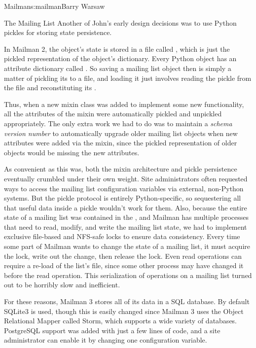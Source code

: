 \begin{aosachapter}{Mailman}{s:mailman}{Barry Warsaw}
\begin{aosasect1}{The Mailing List}
Another of John's early
design decisions was to use Python pickles for storing 
state persistence.

In Mailman 2, the  object's state is stored in a file
called , which is just the pickled representation of
the  object's dictionary.  Every Python object has an
attribute dictionary called .  So saving a mailing
list object then is simply a matter of pickling its
 to a file, and loading it just involves reading
the pickle from the file and reconstituting its .

Thus, when a new mixin class was added to implement some new
functionality, all the attributes of the mixin were automatically
pickled and unpickled appropriately.  The only extra work we had to do
was to maintain a \emph{schema version number} to automatically
upgrade older mailing list objects when new attributes were added via
the mixin, since the pickled representation of older 
objects would be missing the new attributes.

As convenient as this was, both the mixin architecture and pickle
persistence eventually crumbled under their own weight.  Site
administrators often requested ways to access the mailing list
configuration variables via external, non-Python systems.  But the
pickle protocol is entirely Python-specific, so sequestering all that
useful data inside a pickle wouldn't work for them.  Also, because the
entire state of a mailing list was contained in the ,
and Mailman has multiple processes that need to read, modify, and
write the mailing list state, we had to implement exclusive file-based
and NFS-safe locks to ensure data consistency.  Every time some part
of Mailman wants to change the state of a mailing list, it must
acquire the lock, write out the change, then release the lock.  Even
read operations can require a re-load of the list's 
file, since some other process may have changed it before the read
operation.  This serialization of operations on a mailing list turned
out to be horribly slow and inefficient.

For these reasons, Mailman 3 stores all of its data in a SQL database.
By default SQLite3 is used, though this is easily changed since
Mailman 3 uses the Object Relational Mapper called Storm, which
supports a wide variety of databases.  PostgreSQL support was added
with just a few lines of code, and a site administrator can enable it
by changing one configuration variable.


\end{aosasect1}
\end{aosachapter}
